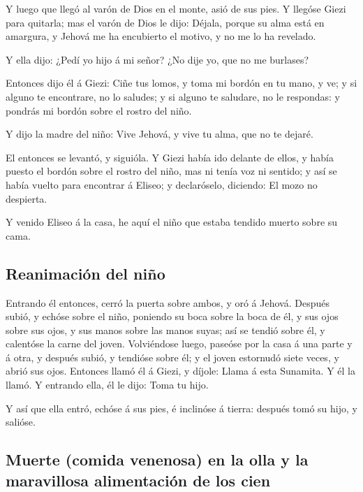  Y luego que llegó al varón de Dios en el monte, asió de
sus pies. Y llegóse Giezi para quitarla; mas el varón de Dios le dijo:
Déjala, porque su alma está en amargura, y Jehová me ha encubierto el
motivo, y no me lo ha revelado.

 Y ella dijo: ¿Pedí yo hijo á mi señor? ¿No dije yo, que
no me burlases?

 Entonces dijo él á Giezi: Ciñe tus lomos, y toma mi
bordón en tu mano, y ve; y si alguno te encontrare, no lo saludes; y si
alguno te saludare, no le respondas: y pondrás mi bordón sobre el rostro
del niño.

 Y dijo la madre del niño: Vive Jehová, y vive tu alma,
que no te dejaré.

 El entonces se levantó, y siguióla. Y Giezi había ido
delante de ellos, y había puesto el bordón sobre el rostro del niño, mas
ni tenía voz ni sentido; y así se había vuelto para encontrar á Eliseo;
y declaróselo, diciendo: El mozo no despierta.

 Y venido Eliseo á la casa, he aquí el niño que estaba
tendido muerto sobre su cama.

\hypertarget{reanimaciuxf3n-del-niuxf1o}{%
\subsection{Reanimación del niño}\label{reanimaciuxf3n-del-niuxf1o}}

 Entrando él entonces, cerró la puerta sobre ambos, y oró
á Jehová.  Después subió, y echóse sobre el niño,
poniendo su boca sobre la boca de él, y sus ojos sobre sus ojos, y sus
manos sobre las manos suyas; así se tendió sobre él, y calentóse la
carne del joven.  Volviéndose luego, paseóse por la casa
á una parte y á otra, y después subió, y tendióse sobre él; y el joven
estornudó siete veces, y abrió sus ojos.  Entonces llamó
él á Giezi, y díjole: Llama á esta Sunamita. Y él la llamó. Y entrando
ella, él le dijo: Toma tu hijo.

 Y así que ella entró, echóse á sus pies, é inclinóse á
tierra: después tomó su hijo, y salióse.

\hypertarget{muerte-comida-venenosa-en-la-olla-y-la-maravillosa-alimentaciuxf3n-de-los-cien}{%
\subsection{Muerte (comida venenosa) en la olla y la maravillosa
alimentación de los
cien}\label{muerte-comida-venenosa-en-la-olla-y-la-maravillosa-alimentaciuxf3n-de-los-cien}}


